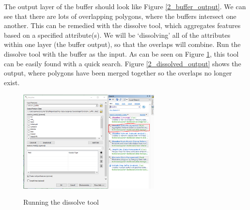 \documentclass{article}
\begin{document}
The output layer of the buffer should look like Figure \ref{2_buffer_output}. We can see that there are lots of overlapping polygons, where the buffers intersect one another. This can be remedied with the dissolve tool, which aggregates features based on a specified attribute(s). We will be `dissolving' all of the attributes within one layer (the buffer output), so that the overlaps will combine. Run the dissolve tool with the buffer as the input. As can be seen on Figure \ref{2_dissolve}, this tool can be easily found with a quick search. Figure \ref{2_dissolved_output} shows the output, where polygons have been merged together so the overlaps no longer exist.

\begin{figure}[h]
  \centering
  \caption{Running the dissolve tool}
  \includegraphics[width=270px]{images/part2/volcano_buffer_dissolved.PNG}
  \label{2_dissolve}
\end{figure}

\pagebreak
\end{document}
